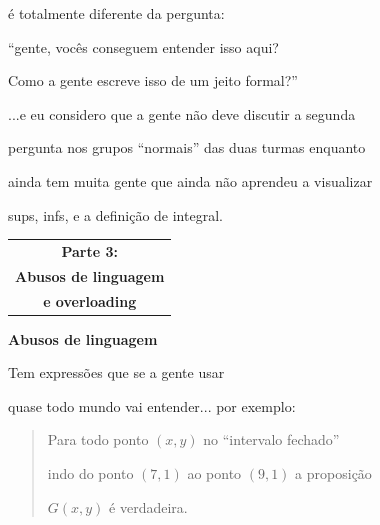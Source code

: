 \documentclass[oneside,12pt]{article}
\begin{document}
é totalmente diferente da pergunta:

\ssk

``gente, vocês conseguem entender isso aqui?

Como a gente escreve isso de um jeito formal?''

\msk

...e eu considero que a gente não deve discutir a segunda

pergunta nos grupos ``normais'' das duas turmas enquanto

ainda tem muita gente que ainda não aprendeu a visualizar

sups, infs, e a definição de integral.

\newpage


\thispagestyle{empty}

\begin{center}

\vspace*{1.2cm}

\begin{tabular}{c}
{\bf \large Parte 3:} \\
{\bf \Large Abusos de linguagem} \\
{\bf \Large e overloading} \\
\end{tabular}

\end{center}

\newpage


{\bf Abusos de linguagem}

Tem expressões que se a gente usar 

quase todo mundo vai entender... por exemplo:

\begin{quotation}

  Para todo ponto $(x,y)$ no ``intervalo fechado''

  indo do ponto $(7,1)$ ao ponto $(9,1)$ a proposição

  $G(x,y)$ é verdadeira.

\end{quotation}
\end{document}
